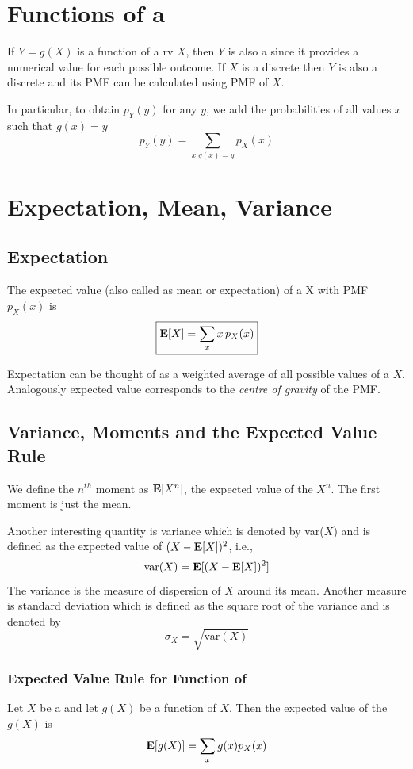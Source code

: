 \section{Functions of a \RV}
If $Y=g(X)$ is a function of a rv $X$, then $Y$ is also a \rv since it provides a numerical value for each possible outcome. If $X$ is a discrete \rv then $Y$ is also a discrete \rv and its PMF can be calculated using PMF of $X$. 

In particular, to obtain $p_Y(y)$ for any $y$, we add the probabilities of all values $x$ such that $g(x)=y$
\[p_Y(y)=\sum_{x|g(x)=y}p_X(x)\]

\section{Expectation, Mean, Variance}
\subsection{Expectation}
\begin{definition}
    The expected value (also called as mean or expectation) of a \rv X with PMF $p_X(x)$ is 
    \[ \boxed{\operatorname{\textbf{E}}[X] = \sum_x x \, p_X(x)}\]
\end{definition}

Expectation can be thought of as a weighted average of all possible values of a \rv $X$. Analogously expected value corresponds to the \textit{centre of gravity} of the PMF.

\subsection{Variance, Moments and the Expected Value Rule}
We define the $n^{th}$ moment as $\operatorname{\textbf{E}}[X^n]$, the expected value of the \rv $X^n$. The first moment is just the mean.

Another interesting quantity is variance which is denoted by var($X$) and is defined as the expected value of $(X-\operatorname{\textbf{E}}[X])^2$, i.e.,
\[\text{var}(X) = \operatorname{\textbf{E}}[(X-\operatorname{\textbf{E}}[X])^2]\]
The variance is the measure of dispersion of $X$ around its mean. Another measure is standard deviation which is defined as the square root of the variance and is denoted by 
\[\sigma_X = \sqrt{\text{var}(X)}\]

\subsubsection{Expected Value Rule for Function of \RV}
Let $X$ be a \rv and let $g(X)$ be a function of $X$. Then the expected value of the \rv $g(X)$ is
\[\operatorname{\textbf{E}}[g(X)] = \sum_x g(x) p_X(x)\]

